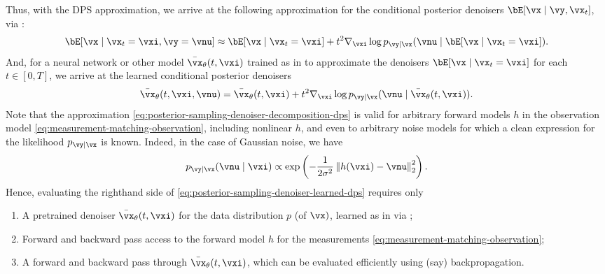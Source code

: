 \documentclass[../../book-main.tex]{subfiles}
\begin{document}
Thus, with the DPS approximation, we arrive at the following approximation for
the conditional posterior denoisers $\bE[\vx \mid \vy, \vx_t]$, via
:
\begin{equation}
  \bE[ \vx \mid \vx_t=\vxi, \vy=\vnu]
  \approx
  \bE[\vx \mid \vx_t=\vxi] 
  + t^2 \nabla_{\vxi} \log p_{\vy \mid \vx}(\vnu \mid \bE[\vx \mid \vx_t = \vxi]).
  \label{eq:posterior-sampling-denoiser-decomposition-dps}
\end{equation}
And, for a neural network or other model $\bar{\vx}_{\theta}(t, \vxi)$ 
trained as in  to approximate the denoisers
$\bE[\vx \mid \vx_t = \vxi]$ for each $t \in [0, T]$, we arrive at the learned
conditional posterior denoisers
\begin{equation}
  \bar{\vx}_{\theta}(t, \vxi, \vnu) 
  = \bar{\vx}_{\theta}(t, \vxi)
  + t^2 \nabla_{\vxi} \log p_{\vy \mid \vx}(\vnu \mid \bar{\vx}_{\theta}(t,
  \vxi)).
  \label{eq:posterior-sampling-denoiser-learned-dps}
\end{equation}
Note that the approximation
\eqref{eq:posterior-sampling-denoiser-decomposition-dps} is  valid for arbitrary
forward models $h$ in the
observation model \eqref{eq:measurement-matching-observation}, including
nonlinear $h$, and even to
arbitrary noise models for which a clean expression for the likelihood $p_{\vy
\mid \vx}$ is known. Indeed, in the case of Gaussian noise, we have
\begin{equation}
  p_{\vy \mid \vx}(\vnu \mid \vxi)
  \propto
  \exp\left(
    -\frac{1}{2\sigma^2} \norm*{ h(\vxi) - \vnu }_2^2
  \right).
\end{equation}
Hence, evaluating the righthand side of
\eqref{eq:posterior-sampling-denoiser-learned-dps}
requires only
\begin{enumerate}
  \item A pretrained denoiser $\bar{\vx}_{\theta}(t, \vxi)$ for the data distribution $p$
    (of $\vx)$, learned as in  via
    ;
  \item Forward and backward pass access to the forward model $h$ for the
    measurements \eqref{eq:measurement-matching-observation};
  \item A forward and backward pass through $\bar{\vx}_{\theta}(t, \vxi)$, which can be evaluated
    efficiently using (say) backpropagation.
\end{enumerate}
\end{document}

